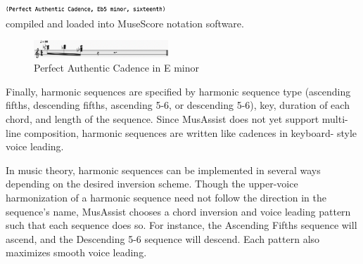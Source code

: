 \documentclass{article}
\begin{document}
\vspace{1mm}
\noindent\includegraphics[width=0.45\textwidth]{images/perfauth_code}\\
\vspace{-2mm}
\noindent compiled and loaded into MuseScore notation software.
\vspace{-1mm}
\begin{figure}[h!]
\centering
\includegraphics[width=0.45\textwidth]{images/perfauth}
  \caption{Perfect Authentic Cadence in E\musFlat\; minor \label{fig:perfauth}}
  \vspace{-3mm}
\end{figure}

Finally, harmonic sequences are specified by harmonic sequence type (ascending fifths, descending fifths, ascending 5-6, or descending 5-6), key, duration of each chord, and length of the sequence. Since MusAssist does not yet support multi-line composition, harmonic sequences are written like cadences in keyboard- style voice leading.

In music theory, harmonic sequences can be implemented in several ways depending on the desired inversion scheme. Though the upper-voice harmonization of a harmonic sequence need not follow the direction in the sequence’s name, MusAssist chooses a chord inversion and voice leading pattern such that each sequence does so. For instance, the Ascending Fifths sequence will ascend, and the Descending 5-6 sequence will descend. Each pattern also maximizes smooth voice leading. 
\end{document}
